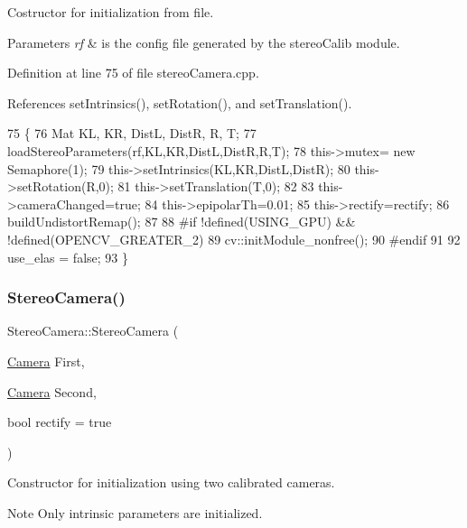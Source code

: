 Costructor for initialization from file. 


\begin{DoxyParams}{Parameters}
{\em rf} & is the config file generated by the stereo\+Calib module. \\
\hline
\end{DoxyParams}


Definition at line 75 of file stereo\+Camera.\+cpp.



References set\+Intrinsics(), set\+Rotation(), and set\+Translation().


\begin{DoxyCode}
75                                                                  \{
76     Mat KL, KR, DistL, DistR, R, T;
77     loadStereoParameters(rf,KL,KR,DistL,DistR,R,T);
78     this->mutex= \textcolor{keyword}{new} Semaphore(1);
79     this->setIntrinsics(KL,KR,DistL,DistR);
80     this->setRotation(R,0);
81     this->setTranslation(T,0);
82 
83     this->cameraChanged=\textcolor{keyword}{true};
84     this->epipolarTh=0.01;
85     this->rectify=rectify;
86     buildUndistortRemap();
87 
88 \textcolor{preprocessor}{#if !defined(USING\_GPU) && !defined(OPENCV\_GREATER\_2)}
89     cv::initModule\_nonfree();
90 \textcolor{preprocessor}{#endif }
91 
92     use\_elas = \textcolor{keyword}{false};
93 \}
\end{DoxyCode}
\mbox{\label{classStereoCamera_a5bfcf3ef7c9d45802bacbf040e7ca112}} 
\subsubsection{\texorpdfstring{Stereo\+Camera()}{StereoCamera()}\hspace{0.1cm}{\footnotesize\ttfamily [3/3]}}
{\footnotesize\ttfamily Stereo\+Camera\+::\+Stereo\+Camera (\begin{DoxyParamCaption}\item[{\hyperlink{classCamera}{Camera}}]{First,  }\item[{\hyperlink{classCamera}{Camera}}]{Second,  }\item[{bool}]{rectify = {\ttfamily true} }\end{DoxyParamCaption})}



Constructor for initialization using two calibrated cameras. 

\begin{DoxyNote}{Note}
Only intrinsic parameters are initialized. 
\end{DoxyNote}

